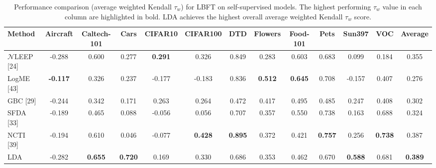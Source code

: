 \begin{table*}
    \setlength\tabcolsep{5pt}
    \footnotesize
    \centering
    \caption{Performance comparison (average weighted Kendall $\tau_w$) for LBFT on self-supervised models. 
    The highest performing $\tau_w$ value in each column are highlighted in bold. LDA achieves the highest overall average weighted Kendall $\tau_w$ score.}
    \label{tab:ss_LBFT}
    \begin{adjustbox}{max width=\textwidth}
    \begin{tabular}{l|ccccccccccc|c}
        \toprule
        Method & Aircraft & Caltech-101 & Cars & CIFAR10 & CIFAR100 & DTD & Flowers & Food-101 & Pets & Sun397 & VOC & Average \\
        \midrule
        $\mathcal{N}$LEEP [24] & -0.288 & 0.600 & 0.277 & \textbf{0.291} & 0.326 & 0.849 & 0.283 & 0.603 & 0.683 & 0.099 & 0.184 & 0.355 \\
        LogME [43]  & \textbf{-0.117} & 0.326 & 0.237 & -0.177 & -0.183 & 0.836 & \textbf{0.512} & \textbf{0.645} & 0.708 & -0.157 & 0.407 & 0.276 \\
        GBC [29]     & -0.244 & 0.342 & 0.171 & 0.263 & 0.264 & 0.472 & 0.417 & 0.495 & 0.485 & 0.247 & 0.408 & 0.302 \\
        SFDA [33]    & -0.189 & 0.465 & 0.088 & -0.056 & 0.056 & 0.707 & 0.357 & 0.550 & 0.738 & 0.163 & 0.688 & 0.324 \\
        NCTI [39]    & -0.194 & 0.610 & 0.046 & -0.077 & \textbf{0.428} &\textbf{0.895} & 0.372 & 0.421 & \textbf{0.757} & 0.256 & \textbf{0.738} & 0.387 \\
        LDA & -0.282 & \textbf{0.655} & \textbf{0.720} & 0.169 & 0.330 & 0.686 & 0.353 & 0.462 & 0.670 & \textbf{0.588} & 0.681 & \textbf{0.389} \\
        \bottomrule
    \end{tabular}
    \end{adjustbox}

\end{table*}


